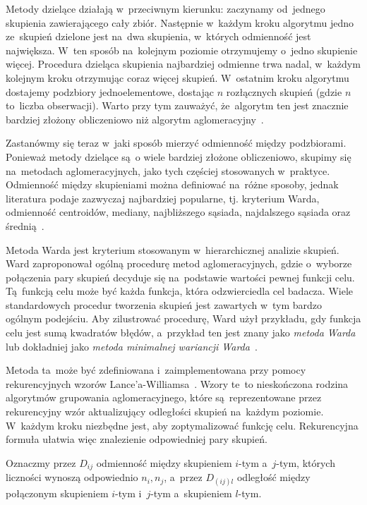 \documentclass{praca1}
\begin{document}
Metody dzielące działają w~przeciwnym kierunku: zaczynamy od~jednego skupienia zawierającego cały zbiór. Następnie w~każdym kroku algorytmu jedno ze~skupień dzielone jest na~dwa skupienia, w~których odmienność jest największa. W~ten sposób na~kolejnym poziomie otrzymujemy o~jedno skupienie więcej. Procedura dzieląca skupienia najbardziej odmienne trwa nadal, w~każdym kolejnym kroku otrzymując coraz więcej skupień. W~ostatnim kroku algorytmu dostajemy podzbiory jednoelementowe, dostając $n$ rozłącznych skupień (gdzie $n$ to~liczba obserwacji). Warto przy tym zauważyć, że~algorytm ten jest znacznie bardziej złożony obliczeniowo niż algorytm aglomeracyjny~\cite{Hastie2009:elements, Koronacki2005:statystyczne}.

Zastanówmy się teraz w~jaki sposób mierzyć odmienność między podzbiorami. Ponieważ metody dzielące są~o wiele bardziej złożone obliczeniowo, skupimy się na~metodach aglomeracyjnych, jako tych częściej stosowanych w~praktyce. Odmienność między skupieniami można definiować na~różne sposoby, jednak literatura podaje zazwyczaj najbardziej popularne, tj. kryterium Warda, odmienność centroidów, mediany, najbliższego sąsiada, najdalszego sąsiada oraz średnią~\cite{Hastie2009:elements, Koronacki2005:statystyczne}.

Metoda Warda jest kryterium stosowanym w~hierarchicznej analizie skupień. Ward zaproponował ogólną procedurę metod aglomeracyjnych, gdzie o~wyborze połączenia pary skupień decyduje się na~podstawie wartości pewnej funkcji celu. Tą~funkcją celu może być każda funkcja, która odzwierciedla cel badacza. Wiele standardowych procedur tworzenia skupień jest zawartych w~tym bardzo ogólnym podejściu. Aby zilustrować procedurę, Ward użył przykładu, gdy funkcja celu jest sumą kwadratów błędów, a~przykład ten jest znany jako \emph{metoda Warda} lub dokładniej jako \emph{metoda minimalnej wariancji Warda}~\cite{Ward1963:hierarchical}.

Metoda ta~może być zdefiniowana i~zaimplementowana przy pomocy rekurencyjnych wzorów Lance'a-Williamsa~\cite{Lance1967:hierarchical}. Wzory te~to nieskończona rodzina algorytmów grupowania aglomeracyjnego, które są~reprezentowane przez rekurencyjny wzór aktualizujący odległości skupień na~każdym poziomie. W~każdym kroku niezbędne jest, aby zoptymalizować funkcję celu. Rekurencyjna formuła ułatwia więc znalezienie odpowiedniej pary skupień.	

Oznaczmy przez $D_{ij}$ odmienność między skupieniem $i$-tym a~$j$-tym, których liczności wynoszą odpowiednio $n_i, n_j$, a~przez $D_{(ij)l}$ odległość między połączonym skupieniem $i$-tym i~$j$-tym a~skupieniem $l$-tym.
\end{document}
